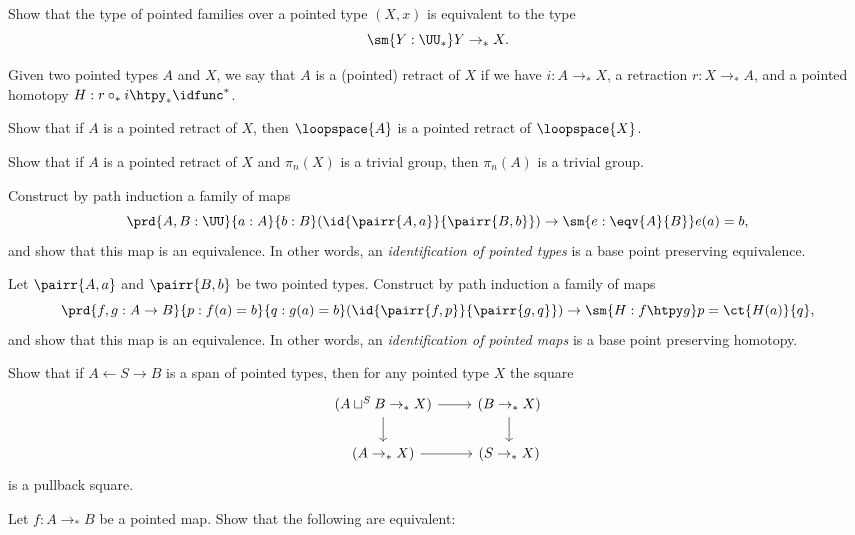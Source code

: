 \begin{exercises}
\item Show that the type of pointed families over a pointed type $(X,x)$ is equivalent to the type
\begin{equation*}
\sm{Y:\UU_\ast} Y\to_\ast X.
\end{equation*}
\item Given two pointed types $A$ and $X$, we say that $A$ is a (pointed) retract of $X$ if we have $i:A\to_\ast X$, a retraction $r:X\to_\ast A$, and a pointed homotopy $H:r\circ_\ast i\htpy_\ast \idfunc^\ast$. 
\begin{subexenum}
\item Show that if $A$ is a pointed retract of $X$, then $\loopspace{A}$ is a pointed retract of $\loopspace{X}$. 
\item Show that if $A$ is a pointed retract of $X$ and $\pi_n(X)$ is a trivial group, then $\pi_n(A)$ is a trivial group.
\end{subexenum}
\item Construct by path induction a family of maps
\begin{equation*}
\prd{A,B:\UU}{a:A}{b:B} (\id{\pairr{A,a}}{\pairr{B,b}})\to \sm{e:\eqv{A}{B}}e(a)=b,
\end{equation*}
and show that this map is an equivalence. In other words, an \emph{identification of pointed types} is a base point preserving equivalence.
\item Let $\pairr{A,a}$ and $\pairr{B,b}$ be two pointed types. Construct by path induction a family of maps
\begin{equation*}
\prd{f,g:A\to B}{p:f(a)=b}{q:g(a)=b} (\id{\pairr{f,p}}{\pairr{g,q}})\to \sm{H:f\htpy g} p = \ct{H(a)}{q},
\end{equation*}
and show that this map is an equivalence. In other words, an \emph{identification of pointed maps} is a base point preserving homotopy.
\item Show that if $A\leftarrow S\rightarrow B$ is a span of pointed types, then for any pointed type $X$ the square
\begin{equation*}
\begin{tikzcd}
(A\sqcup^S B \to_\ast X) \arrow[r] \arrow[d] & (B \to_\ast X) \arrow[d] \\
(A\to_\ast X) \arrow[r] & (S\to_\ast X)
\end{tikzcd}
\end{equation*}
is a pullback square.
\item \label{ex:yoneda_ptd_types}Let $f:A\to_\ast B$ be a pointed map. Show that the following are equivalent:

\end{exercises}
